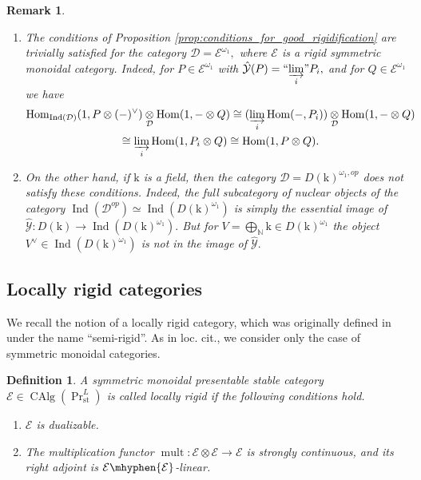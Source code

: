\documentclass[11pt,leqno]{amsart}
\newtheorem{defi}[theo]{Definition}
\newtheorem{remark}[theo]{Remark}
\numberwithin{equation}{section}
\def\N{\mathbb{N}}
\def\Hom{\operatorname{Hom}}
\newcommand{\tens}[1]{%
  \mathbin{\mathop{\otimes}\displaylimits_{#1}}%
}
\newcommand{\hy}{\mhyphen}
\newcommand{\indlim}[1][]{\mathop{\varinjlim}\limits_{#1}}
\newcommand{\inddlim}[1][]{{``{\indlim[#1]}"}}
\newcommand{\biggplus}[1][]{\mathop{\bigoplus}\limits_{#1}}
\newcommand{\st}{\operatorname{st}}
\newcommand{\mk}{\mathrm k}
\newcommand{\cD}{{\mathcal D}}
\newcommand{\cE}{{\mathcal E}}
\newcommand{\cY}{{\mathcal Y}}
\newcommand{\CAlg}{\operatorname{CAlg}}
\newcommand{\Ind}{\operatorname{Ind}}
\newcommand{\mult}{\operatorname{mult}}
\begin{document}
\begin{remark}
\begin{enumerate}[label=(\roman*), ref=(\roman*)]
\item The conditions of Proposition \ref{prop:conditions_for_good_rigidification} are trivially satisfied for the category $\cD=\cE^{\omega_1},$ where $\cE$ is a rigid symmetric monoidal category. Indeed, for $P\in\cE^{\omega_1}$ with $\hat{\cY}(P)=\inddlim[i]P_i,$ and for $Q\in\cE^{\omega_1}$ we have
\begin{multline*}
\Hom_{\Ind(\cD)}(1,P\otimes (-)^{\vee})\tens{\cD}\Hom(1,-\otimes Q)\cong (\indlim[i]\Hom(-,P_i))\tens{\cD}\Hom(1,-\otimes Q)\\
\cong \indlim[i]\Hom(1,P_i\otimes Q)\cong \Hom(1,P\otimes Q).
\end{multline*}
\item On the other hand, if $\mk$ is a field, then the category $\cD=D(\mk)^{\omega_1,op}$ does not satisfy these conditions. Indeed, the full subcategory of nuclear objects of the category $\Ind(\cD^{op})\simeq\Ind(D(\mk)^{\omega_1})$ is simply the essential image of $\hat{\cY}:D(\mk)\to \Ind(D(\mk)^{\omega_1}).$ But for $V=\biggplus[\N]\mk\in D(\mk)^{\omega_1}$ the object $V^{\vee}\in \Ind(D(\mk)^{\omega_1})$ is not in the image of $\hat{\cY}.$ 
\end{enumerate}
\end{remark}

\subsection{Locally rigid categories}

We recall the notion of a locally rigid category, which was originally defined in \cite{AGKRV20} under the name ``semi-rigid''. As in loc. cit., we consider only the case of symmetric monoidal categories.

\begin{defi}\cite[Definition C.1.1]{AGKRV20} A symmetric monoidal presentable stable category $\cE\in\CAlg(\Pr^L_{\st})$ is called locally rigid if the following conditions hold.
\begin{enumerate}[label=(\roman*),ref=(\roman*)]
\item $\cE$ is dualizable.

\item The multiplication functor $\mult:\cE\otimes\cE\to\cE$ is strongly continuous, and its right adjoint is $\cE\hy\cE$-linear.
\end{enumerate}\end{defi}
\end{document}
